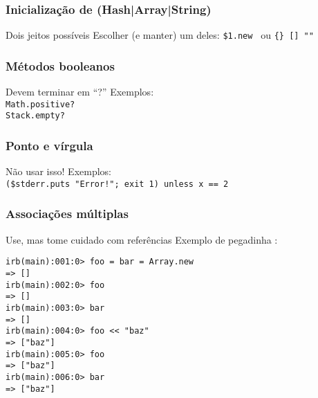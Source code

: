 \documentclass{beamer}
\begin{document}
\begin{frame}[fragile]
    \frametitle{Inicialização de (Hash|Array|String)}
    \begin{block}{Dois jeitos possíveis}
        Escolher (e manter) um deles: \verb#$1.new # ou \verb#{} [] ""#
    \end{block}
\end{frame}

\begin{frame}[fragile]
    \frametitle{Métodos booleanos}
    \begin{block}{Devem terminar em ``?''}
        Exemplos:\\
        \verb#Math.positive? #\\
        \verb#Stack.empty?   #\\
    \end{block}
\end{frame}

\begin{frame}[fragile]
    \frametitle{Ponto e vírgula}
    \begin{block}{Não usar isso!}
        Exemplos:\\
        \verb#($stderr.puts "Error!"; exit 1) unless x == 2#
    \end{block}
\end{frame}

\begin{frame}[fragile]
    \frametitle{Associações múltiplas}
    \begin{block}{Use, mas tome cuidado com referências}
        Exemplo de pegadinha :\\
        \begin{verbatim}
irb(main):001:0> foo = bar = Array.new
=> []
irb(main):002:0> foo
=> []
irb(main):003:0> bar
=> []
irb(main):004:0> foo << "baz"
=> ["baz"]
irb(main):005:0> foo
=> ["baz"]
irb(main):006:0> bar
=> ["baz"]
        \end{verbatim}
    \end{block}
\end{frame}




\end{document}
